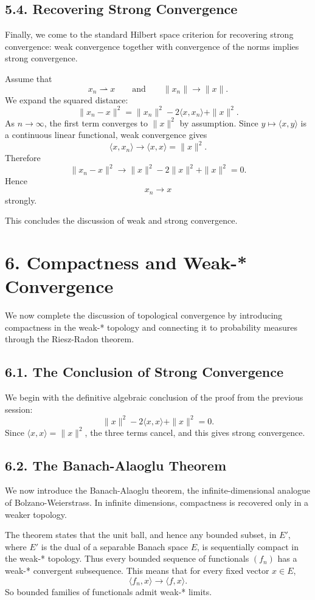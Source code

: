 \documentclass[11pt]{article}
\theoremstyle{definition}
\theoremstyle{remark}
\begin{document}
\subsection*{5.4. Recovering Strong Convergence}
Finally, we come to the standard Hilbert space criterion for recovering strong convergence: weak convergence together with convergence of the norms implies strong convergence.

Assume that
\[
x_n\rightharpoonup x
\qquad \text{and} \qquad
\|x_n\|\to\|x\|.
\]
We expand the squared distance:
\[
\|x_n-x\|^2
=
\|x_n\|^2-2\langle x,x_n\rangle+\|x\|^2.
\]
As \(n\to\infty\), the first term converges to \(\|x\|^2\) by assumption. Since \(y\mapsto \langle x,y\rangle\) is a continuous linear functional, weak convergence gives
\[
\langle x,x_n\rangle\to\langle x,x\rangle=\|x\|^2.
\]
Therefore
\[
\|x_n-x\|^2
\to
\|x\|^2-2\|x\|^2+\|x\|^2
=
0.
\]
Hence
\[
x_n\to x
\]
strongly.

This concludes the discussion of weak and strong convergence.

\section*{6. Compactness and Weak-* Convergence}

We now complete the discussion of topological convergence by introducing compactness in the weak-* topology and connecting it to probability measures through the Riesz-Radon theorem.

\subsection*{6.1. The Conclusion of Strong Convergence}
We begin with the definitive algebraic conclusion of the proof from the previous session:
\[
\|x\|^2-2\langle x,x\rangle+\|x\|^2=0.
\]
Since \(\langle x,x\rangle=\|x\|^2\), the three terms cancel, and this gives strong convergence.

\subsection*{6.2. The Banach-Alaoglu Theorem}
We now introduce the Banach-Alaoglu theorem, the infinite-dimensional analogue of Bolzano-Weierstrass. In infinite dimensions, compactness is recovered only in a weaker topology.

The theorem states that the unit ball, and hence any bounded subset, in \(E'\), where \(E'\) is the dual of a separable Banach space \(E\), is sequentially compact in the weak-* topology. Thus every bounded sequence of functionals \((f_n)\) has a weak-* convergent subsequence. This means that for every fixed vector \(x\in E\),
\[
\langle f_n,x\rangle\to \langle f,x\rangle.
\]
So bounded families of functionals admit weak-* limits.
\end{document}
